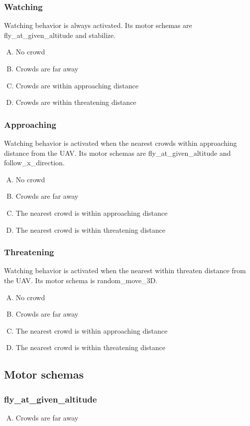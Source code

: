 \subsubsection{Watching}
Watching behavior is always activated. Its motor schemas are fly\_at\_given\_altitude and stabilize.

\begin{enumerate}[A.]
\item No crowd
\item Crowds are far away
\item Crowds are within approaching distance
\item Crowds are within threatening distance
\end{enumerate}

\subsubsection{Approaching}
Watching behavior is activated when the nearest crowds within approaching distance from the UAV. Its motor schemas are fly\_at\_given\_altitude and follow\_x\_direction. 
\begin{enumerate}[A.]
\item No crowd
\item Crowds are far away
\item The nearest crowd is within approaching distance
\item The nearest crowd is within threatening distance
\end{enumerate}

\subsubsection{Threatening}
Watching behavior is activated when the nearest within threaten distance from the UAV. Its motor schema is random\_move\_3D.
\begin{enumerate}[A.]
\item No crowd
\item Crowds are far away
\item The nearest crowd is within approaching distance
\item The nearest crowd is within threatening distance
\end{enumerate}

\subsection{Motor schemas}
\subsubsection{fly\_at\_given\_altitude}
\begin{enumerate}[A.]
\item Crowds are far away
\end{enumerate}

